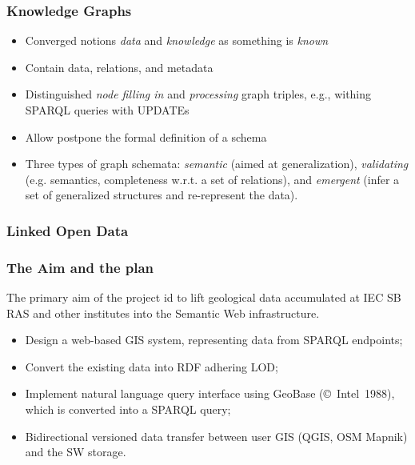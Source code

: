 \documentclass[10pt]{beamer}
\begin{document}

\begin{frame}
  \frametitle{Knowledge Graphs}
  \begin{itemize}
  \item Converged notions \emph{data} and \emph{knowledge} as something is \emph{known}
  \item Contain data, relations, and metadata
  \item Distinguished \emph{node filling in} and \emph{processing} graph triples, e.g., withing SPARQL queries with UPDATEs
  \item Allow postpone the formal definition of a schema
  \item Three types of graph schemata: \emph{semantic} (aimed at generalization), \emph{validating} (e.g. semantics, completeness w.r.t. a set of relations), and \emph{emergent} (infer a set of generalized structures and re-represent the data).
  \end{itemize}
\end{frame}


\begin{frame}
  \frametitle{Linked Open Data}
\end{frame}

\begin{frame}
  \frametitle{The Aim and the plan}
  The primary aim of the project id to lift geological data accumulated at IEC SB RAS and other institutes into the Semantic Web infrastructure.
  \begin{itemize}
  \item Design a web-based GIS system, representing data from SPARQL endpoints;
  \item Convert the existing data into RDF adhering LOD;

  \item Implement natural language query interface using GeoBase (\copyright~Intel~1988), which is converted into a SPARQL query;
  \item Bidirectional versioned data transfer between user GIS (QGIS, OSM Mapnik) and the SW storage. %
  \end{itemize}
\end{frame}
\end{document}
